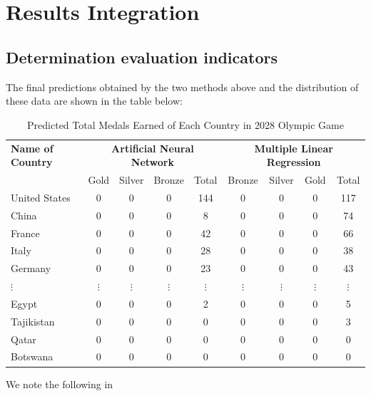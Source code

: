 \documentclass{mcmthesis}
\begin{document}
\section{Results Integration}\label{RestultsIntegration}
\subsection{Determination evaluation indicators}
The final predictions obtained by the two methods above and the distribution of these data are shown in the table below:

\begin{table}[H]
\centering 
\caption{Predicted Total Medals Earned of Each Country in 2028 Olympic Game}
\label{A}
\vspace{5pt}
\begin{tabular}{l|cccc|cccc}
\hline
\textbf{Name of Country} & 
\multicolumn{4}{c}{\textbf{Artificial Neural Network}} & 
\multicolumn{4}{c}{\textbf{Multiple Linear Regression}} \\
\cline{2-5} \cline{6-9}
& Gold & Silver & Bronze & Total & Bronze & Silver & Gold & Total \\
\hline\hline
United States & 0 & 0 & 0 & 144 & 0 & 0 & 0 & 117 \\
China         & 0 & 0 & 0 & 8   & 0 & 0 & 0 & 74 \\
France        & 0 & 0 & 0 & 42  & 0 & 0 & 0 & 66 \\
Italy         & 0 & 0 & 0 & 28  & 0 & 0 & 0 & 38 \\
Germany       & 0 & 0 & 0 & 23  & 0 & 0 & 0 & 43 \\ 
$\vdots$ & $\vdots$ & $\vdots$ & $\vdots$ & $\vdots$ & $\vdots$ & $\vdots$ & $\vdots$ & $\vdots$ \\ 
Egypt         & 0 & 0 & 0 & 2   & 0 & 0 & 0 & 5 \\
Tajikistan    & 0 & 0 & 0 & 0   & 0 & 0 & 0 & 3 \\
Qatar         & 0 & 0 & 0 & 0   & 0 & 0 & 0 & 0 \\
Botswana      & 0 & 0 & 0 & 0   & 0 & 0 & 0 & 0 \\ 
\hline
\end{tabular}
\end{table}


We note the following in 
\end{document}
